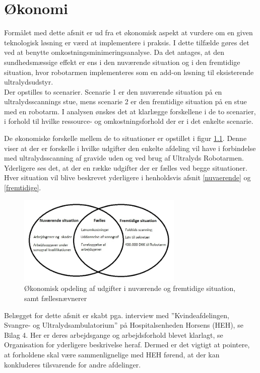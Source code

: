 \chapter{Økonomi} \label{Okonomi}
Formålet med dette afsnit er ud fra et økonomisk aspekt at vurdere om en given teknologisk løsning er værd at implementere i praksis. I dette tilfælde gøres det ved at benytte omkostningsminimeringsanalyse. Da det antages, at den sundhedsmæssige effekt er ens i den nuværende situation og i den fremtidige situation, hvor robotarmen implementeres som en add-on løsning til eksisterende ultralydsudstyr. \\
Der opstilles to scenarier. Scenarie 1 er den nuværende situation på en ultralydsscannings stue, mens scenarie 2 er den fremtidige situation på en stue med en robotarm. I analysen ønskes det at klarlægge forskellene i de to scenarier, i forhold til hvilke ressource- og omkostningsforhold der er i det enkelte scenarie. 

De økonomiske forskelle mellem de to situationer er opstillet i figur \ref{ModelOkonomi}. Denne viser at der er forskelle i hvilke udgifter den enkelte afdeling vil have i forbindelse med ultralydsscanning af gravide uden og ved brug af Ultralyds Robotarmen. Yderligere ses det, at der en række udgifter der er fælles ved begge situationer. Hver situation vil blive beskrevet yderligere i henholdsvis afsnit \ref{nuvaerende} og \ref{fremtidige}. 

\begin{figure}[H]\centering
	\includegraphics[width = 0.7\textwidth]{Figurer/ModelOkonomi}
	\caption{Økonomisk opdeling af udgifter i nuværende og fremtidige situation, samt fællesnævnerer}
	\label{ModelOkonomi}
\end{figure}

Belægget for dette afsnit er skabt pga. interview med ”Kvindeafdelingen, Svangre- og Ultralydsambulatorium” på Hospitalsenheden Horsens (HEH), se Bilag 4. Her er deres arbejdsgange og arbejdsforhold blevet klarlagt, se Organisation for yderligere beskrivelse heraf. Dermed er det vigtigt at pointere, at forholdene skal være sammenlignelige med HEH førend, at der kan konkluderes tilsvarende for andre afdelinger.

